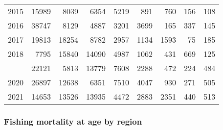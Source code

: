 \documentclass[
]{article}
\begin{document}
\begin{longtable}[t]{lrrrrrrrr}
2015 & 15989 & 8039 & 6354 & 5219 & 891 & 760 & 156 & 108\\
2016 & 38747 & 8129 & 4887 & 3201 & 3699 & 165 & 337 & 145\\
2017 & 19813 & 18254 & 8782 & 2957 & 1134 & 1593 & 75 & 185\\
2018 & 7795 & 15840 & 14090 & 4987 & 1062 & 431 & 669 & 125\\
\addlinespace
2019 & 22121 & 5813 & 13779 & 7608 & 2288 & 472 & 224 & 484\\
2020 & 26897 & 12638 & 6351 & 7510 & 4047 & 930 & 271 & 505\\
2021 & 14653 & 13526 & 13935 & 4472 & 2883 & 2351 & 440 & 513\\*
\end{longtable}

\hypertarget{fishing-mortality-at-age-by-region}{%
\subsubsection{Fishing mortality at age by
region}\label{fishing-mortality-at-age-by-region}}
\end{document}
